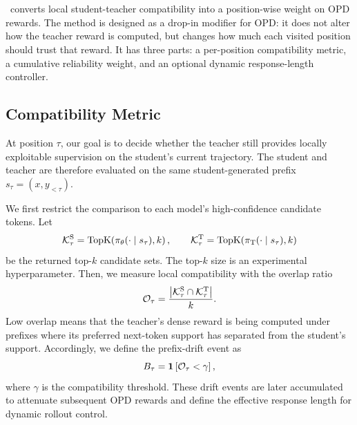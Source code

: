 \section{\method}
\label{sec:method}

\method~converts local student-teacher compatibility into a position-wise weight on OPD rewards.
The method is designed as a drop-in modifier for OPD: it does not alter how the teacher reward is computed, but changes how much each visited position should trust that reward.
It has three parts: a per-position compatibility metric, a cumulative reliability weight, and an optional dynamic response-length controller.

\subsection{Compatibility Metric}

At position $\tau$, our goal is to decide whether the teacher still provides locally exploitable supervision on the student's current trajectory.
The student and teacher are therefore evaluated on the same student-generated
prefix $s_{\tau}=(x,y_{<\tau})$.

We first restrict the comparison to each model's high-confidence candidate
tokens. Let
\begin{equation}
    \mathcal{K}^{\mathrm{S}}_{\tau}
    =
    \operatorname{TopK}\!\left(\pi_{\theta}(\cdot\mid s_{\tau}),k\right),
    \qquad
    \mathcal{K}^{\mathrm{T}}_{\tau}
    =
    \operatorname{TopK}\!\left(\pi_{\mathrm{T}}(\cdot\mid s_{\tau}),k\right)
\end{equation}
be the returned top-$k$ candidate sets.
The top-$k$ size is an experimental hyperparameter.
Then, we measure local compatibility with the overlap ratio
\begin{equation}
    \mathcal{O}_{\tau}
    =
    \frac{
    \left|\mathcal{K}^{\mathrm{S}}_{\tau}\cap \mathcal{K}^{\mathrm{T}}_{\tau}\right|
    }{k}.
    \label{eq:local-overlap}
\end{equation}
Low overlap means that the teacher's dense reward is being computed under prefixes where its preferred next-token support has separated from the student's support. Accordingly, we define the prefix-drift event as
\begin{equation}
    B_{\tau}
    =
    \mathbf{1}\left[\mathcal{O}_{\tau} < \gamma\right],
    \label{eq:bad-event}
\end{equation}
where $\gamma$ is the compatibility threshold.
These drift events are later accumulated to attenuate subsequent OPD rewards and define the effective response length for dynamic rollout control.

